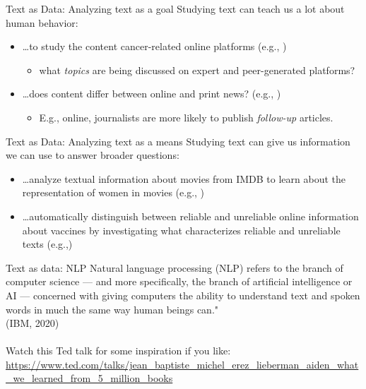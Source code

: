 \documentclass[handout]{beamer}
\begin{document}
\begin{frame}{Text as Data: Analyzing text as a goal}
	Studying text can teach us a lot about human behavior:
	\begin{itemize}[<+->]
	\item \dots to study the content cancer-related online platforms (e.g., \cite{sanders_different_2020})
	\begin{itemize}
	\item what \emph{topics} are being discussed on expert and peer-generated platforms?
	\end{itemize}
	\item \dots does content differ between online and print news? (e.g., \cite{burggraaff_through_2020})
	\begin{itemize}
	\item E.g., online, journalists are more likely to publish \emph{follow-up} articles.
	\end{itemize}
	\end{itemize}
\end{frame}
	
\begin{frame}{Text as Data: Analyzing text as a means}
Studying text can give us information we can use to answer broader questions: 
\begin{itemize}[<+->]
	\item \dots analyze textual information about movies from IMDB to learn about the representation of women in movies (e.g.,\cite{poma-murialdo_gender_2019} )
	\item \dots automatically distinguish between reliable and unreliable online information about vaccines 
	by investigating what characterizes reliable and unreliable texts (e.g.,\cite{meppelink_reliable_2021})
\end{itemize}
\end{frame}

\begin{frame}{Text as data: NLP}
\alert{Natural language processing (NLP)} refers to the branch of computer science — and more specifically, the branch of artificial intelligence or AI — concerned with giving computers the ability to understand text and spoken words in much the same way human beings can."  \\
\tiny{(IBM, 2020)}
\\ \\
Watch this Ted talk for some inspiration if you like: 
\url{https://www.ted.com/talks/jean_baptiste_michel_erez_lieberman_aiden_what_we_learned_from_5_million_books}
\end{frame}
\end{document}
